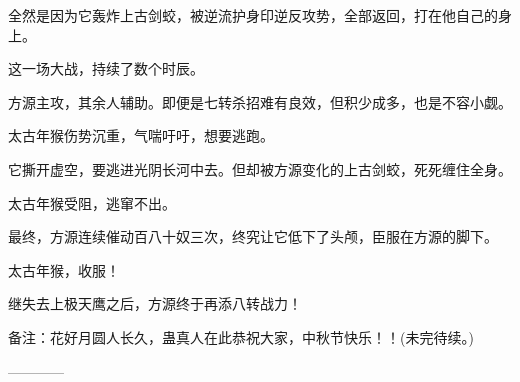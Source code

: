 \begin{this_body}
全然是因为它轰炸上古剑蛟，被逆流护身印逆反攻势，全部返回，打在他自己的身上。

这一场大战，持续了数个时辰。

方源主攻，其余人辅助。即便是七转杀招难有良效，但积少成多，也是不容小觑。

太古年猴伤势沉重，气喘吁吁，想要逃跑。

它撕开虚空，要逃进光阴长河中去。但却被方源变化的上古剑蛟，死死缠住全身。

太古年猴受阻，逃窜不出。

最终，方源连续催动百八十奴三次，终究让它低下了头颅，臣服在方源的脚下。

太古年猴，收服！

继失去上极天鹰之后，方源终于再添八转战力！

备注：花好月圆人长久，蛊真人在此恭祝大家，中秋节快乐！！(未完待续。)

------------

\end{this_body}


